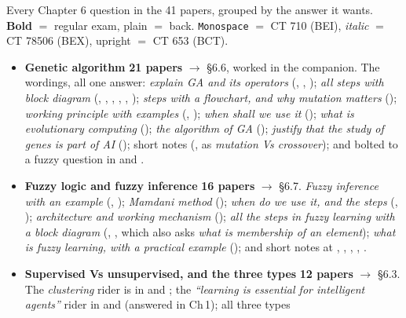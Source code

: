 {\color{sub}\footnotesize Every Chapter 6 question in the 41 papers, grouped by the answer
it wants. \textbf{Bold} $=$ regular exam, plain $=$ back. \texttt{Monospace} $=$ CT 710
(BEI), \textit{italic} $=$ CT 78506 (BEX), upright $=$ CT 653 (BCT).}

\begin{itemize}
  \item \textbf{Genetic algorithm} \textbf{21 papers} $\rightarrow$ \S6.6, worked in the companion.
        The wordings, all one answer: \emph{explain GA and its operators}
        (, , ); \emph{all steps with block diagram}
        (, , ,
        , , );
        \emph{steps with a flowchart, and why mutation matters} ();
        \emph{working principle with examples} (,
        ); \emph{when shall we use it} ();
        \emph{what is evolutionary computing} ();
        \emph{the algorithm of GA} (); \emph{justify that the study of
        genes is part of AI} (); short notes
        (,  as
        \emph{mutation Vs crossover}); and bolted to a fuzzy question in
         and .
  \item \textbf{Fuzzy logic and fuzzy inference} \textbf{16 papers} $\rightarrow$ \S6.7.
        \emph{Fuzzy inference with an example} (, );
        \emph{Mamdani method} (); \emph{when do we use it, and the steps}
        (, ); \emph{architecture and working mechanism}
        (); \emph{all the steps in fuzzy learning with a block diagram}
        (, , which also asks
        \emph{what is membership of an element}); \emph{what is fuzzy learning, with a
        practical example} (); and short notes at
        , , , ,
        .
  \item \textbf{Supervised Vs unsupervised, and the three types} \textbf{12 papers}
        $\rightarrow$ \S6.3. The \emph{clustering} rider is in
         and ; the
        \emph{``learning is essential for intelligent agents''} rider in
         and  (answered in Ch\,1); all three types

\end{itemize}
